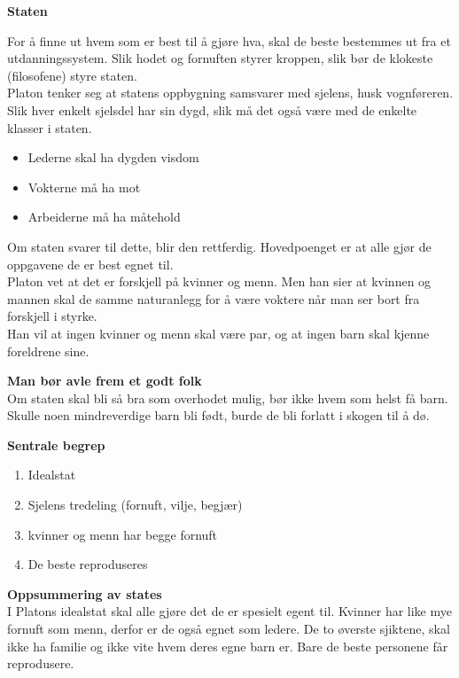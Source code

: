 \documentclass[11pt, a4paper]{article}
\newenvironment{sectionbox}[1][]{%
    \begin{sectionboxinner}
    \textbf{\large #1}
    \vspace{1pt}
    \newline
}{%
    \end{sectionboxinner}
}
\newenvironment{subsectionbox}[1][]{%
    \begin{subsectionboxinner}
        {\bfseries #1}\\[-2pt]
}{%
    \end{subsectionboxinner}
}
\begin{document}
\begin{sectionbox}[Staten]
For å finne ut hvem som er best til å gjøre hva, skal de beste bestemmes ut fra et utdanningssystem. Slik hodet og fornuften styrer kroppen, slik bør de klokeste (filosofene) styre staten.\\

Platon tenker seg at statens oppbygning samsvarer med sjelens, husk vognføreren. Slik hver enkelt sjelsdel har sin dygd, slik må det også være med de enkelte klasser i staten. 
\begin{itemize}
    \item Lederne skal ha dygden visdom
    \item Vokterne må ha mot
    \item Arbeiderne må ha måtehold
\end{itemize}

Om staten svarer til dette, blir den rettferdig. Hovedpoenget er at alle gjør de oppgavene de er best egnet til. \\

Platon vet at det er forskjell på kvinner og menn. Men han sier at kvinnen og mannen skal de samme naturanlegg for å være voktere når man ser bort fra forskjell i styrke.\\

Han vil at ingen kvinner og menn skal være par, og at ingen barn skal kjenne foreldrene sine.

\begin{subsectionbox}[Man bør avle frem et godt folk]

Om staten skal bli så bra som overhodet mulig, bør ikke hvem som helst få barn. Skulle noen mindreverdige barn bli født, burde de bli forlatt i skogen til å dø.

\end{subsectionbox}

\begin{subsectionbox}[Sentrale begrep]
\begin{enumerate}
    \item Idealstat
    \item Sjelens tredeling (fornuft, vilje, begjær)
    \item kvinner og menn har begge fornuft
    \item De beste reproduseres
\end{enumerate}
\end{subsectionbox}

\begin{subsectionbox}[Oppsummering av states]
I Platons idealstat skal alle gjøre det de er spesielt egent til. Kvinner har like mye fornuft som menn, derfor er de også egnet som ledere. De to øverste sjiktene, skal ikke ha familie og ikke vite hvem deres egne barn er. Bare de beste personene får reprodusere.
\end{subsectionbox}

\end{sectionbox}
\end{document}
